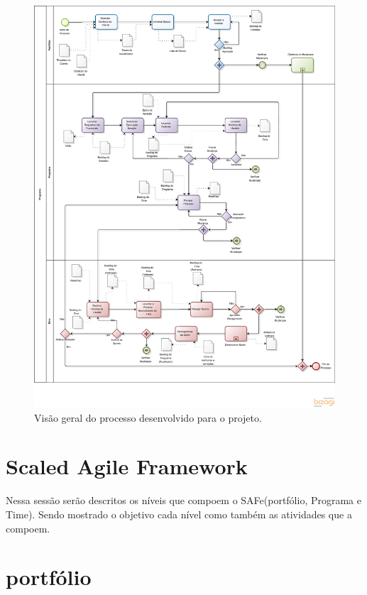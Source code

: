 \begin{figure}[H]
    \centering
	\includegraphics[keepaspectratio=true,scale=0.5]{figuras/Processo_05.eps}
    \caption{Visão geral do processo desenvolvido para o projeto.}
    \label{fig:processo}
\end{figure}

\section{Scaled Agile Framework}\label{safe}

Nessa sessão serão descritos os níveis que compoem o SAFe(portfólio, Programa e Time).
Sendo mostrado o objetivo cada nível como também as atividades que a compoem.

\section{portfólio}

